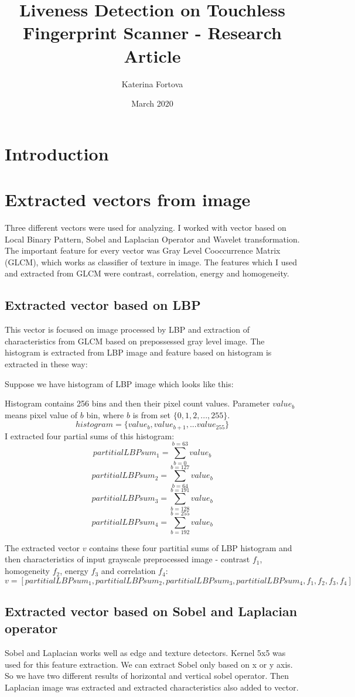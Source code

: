 \documentclass{article}
\title{Liveness Detection on Touchless Fingerprint Scanner - Research Article}
\author{Katerina Fortova}
\date{March 2020}
\begin{document}
\maketitle

\section{Introduction}

\section{Extracted vectors from image}
Three different vectors were used for analyzing. I worked with vector based on Local Binary Pattern, Sobel and Laplacian Operator and Wavelet transformation. The important feature for every vector was Gray Level Cooccurrence Matrix (GLCM), which works as classifier of texture in image. The features which I used and extracted from GLCM were contrast, correlation, energy and homogeneity. 

\subsection{Extracted vector based on LBP}
This vector is focused on image processed by LBP and extraction of characteristics from GLCM based on prepossessed gray level image. The histogram is extracted from LBP image and feature based on histogram is extracted in these way:

Suppose we have histogram of LBP image which looks like this:

Histogram contains 256 bins and then their pixel count values. Parameter $value_b$ means pixel value of $b$ bin, where $b$ is from set $\{0,1,2,...,255\}$.
$$histogram = \{value_b, value_{b+1}, ... value_{255}\}$$
I extracted four partial sums of this histogram:
$$partitialLBPsum_1 = \sum_{b=0}^{b=63} value_b $$
$$partitialLBPsum_2 = \sum_{b=64}^{b=127} value_b $$
$$partitialLBPsum_3 = \sum_{b=128}^{b=191} value_b $$
$$partitialLBPsum_4 = \sum_{b=192}^{b=255} value_b $$

The extracted vector $v$ contains these four partitial sums of LBP histogram and then characteristics of input grayscale preprocessed image - contrast $f_1$, homogeneity $f_2$, energy $f_3$ and correlation $f_4$:
$$v = [partitialLBPsum_1, partitialLBPsum_2, partitialLBPsum_3, partitialLBPsum_4, f_1, f_2, f_3, f_4]$$

\subsection{Extracted vector based on Sobel and Laplacian operator}
Sobel and Laplacian works well as edge and texture detectors. Kernel 5x5 was used for this feature extraction. We can extract Sobel only based on x or y axis. So we have two different results of horizontal and vertical sobel operator. Then Laplacian image was extracted and extracted characteristics also added to vector.
\end{document}
